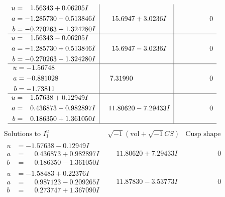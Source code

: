 \documentclass[1p]{elsarticle_modified}
\theoremstyle{definition}
\newcommand{\I}{\sqrt{-1}}
\begin{document}
$$\begin{array}{c|c|c}
\begin{aligned}
u &= \phantom{-}1.56343 + 0.06205 I \\
a &= -1.285730 - 0.513846 I \\
b &= -0.270263 + 1.324280 I\end{aligned}
 & \phantom{-}15.6947 + 3.0236 I & \phantom{-0.000000 } 0 \\ \hline\begin{aligned}
u &= \phantom{-}1.56343 - 0.06205 I \\
a &= -1.285730 + 0.513846 I \\
b &= -0.270263 - 1.324280 I\end{aligned}
 & \phantom{-}15.6947 - 3.0236 I & \phantom{-0.000000 } 0 \\ \hline\begin{aligned}
u &= -1.56748\phantom{ +0.000000I} \\
a &= -0.881028\phantom{ +0.000000I} \\
b &= -1.73811\phantom{ +0.000000I}\end{aligned}
 & \phantom{-}7.31990\phantom{ +0.000000I} & \phantom{-0.000000 } 0 \\ \hline\begin{aligned}
u &= -1.57638 + 0.12949 I \\
a &= \phantom{-}0.436873 - 0.982897 I \\
b &= \phantom{-}0.186350 + 1.361050 I\end{aligned}
 & \phantom{-}11.80620 - 7.29433 I & \phantom{-0.000000 } 0\\
 \hline 
 \end{array}$$\newpage$$\begin{array}{c|c|c}  
\text{Solutions to }I^u_{1}& \I (\text{vol} + \sqrt{-1}CS) & \text{Cusp shape}\\
 \hline 
\begin{aligned}
u &= -1.57638 - 0.12949 I \\
a &= \phantom{-}0.436873 + 0.982897 I \\
b &= \phantom{-}0.186350 - 1.361050 I\end{aligned}
 & \phantom{-}11.80620 + 7.29433 I & \phantom{-0.000000 } 0 \\ \hline\begin{aligned}
u &= -1.58483 + 0.22376 I \\
a &= \phantom{-}0.987123 - 0.209265 I \\
b &= \phantom{-}0.273747 + 1.367090 I\end{aligned}
 & \phantom{-}11.87830 - 3.53773 I & \phantom{-0.000000 } 0 \\ \hline\begin{aligned}

\end{aligned}
\end{array}$$
\end{document}
